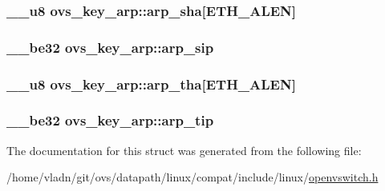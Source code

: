 \subsubsection[{arp\+\_\+sha}]{\setlength{\rightskip}{0pt plus 5cm}\+\_\+\+\_\+u8 ovs\+\_\+key\+\_\+arp\+::arp\+\_\+sha\mbox{[}E\+T\+H\+\_\+\+A\+L\+E\+N\mbox{]}}\label{structovs__key__arp_a99f6141da2e3151181663f27ab1a3560}
\hypertarget{structovs__key__arp_a25ce3912d909430a080dd3264d858892}{}
\subsubsection[{arp\+\_\+sip}]{\setlength{\rightskip}{0pt plus 5cm}\+\_\+\+\_\+be32 ovs\+\_\+key\+\_\+arp\+::arp\+\_\+sip}\label{structovs__key__arp_a25ce3912d909430a080dd3264d858892}
\hypertarget{structovs__key__arp_ab9f27ebc29aee381031d9b89d1b954ac}{}
\subsubsection[{arp\+\_\+tha}]{\setlength{\rightskip}{0pt plus 5cm}\+\_\+\+\_\+u8 ovs\+\_\+key\+\_\+arp\+::arp\+\_\+tha\mbox{[}E\+T\+H\+\_\+\+A\+L\+E\+N\mbox{]}}\label{structovs__key__arp_ab9f27ebc29aee381031d9b89d1b954ac}
\hypertarget{structovs__key__arp_a84a3d1edd8ba5960d41a69155e721d20}{}
\subsubsection[{arp\+\_\+tip}]{\setlength{\rightskip}{0pt plus 5cm}\+\_\+\+\_\+be32 ovs\+\_\+key\+\_\+arp\+::arp\+\_\+tip}\label{structovs__key__arp_a84a3d1edd8ba5960d41a69155e721d20}


The documentation for this struct was generated from the following file\+:\begin{DoxyCompactItemize}
\item 
/home/vladn/git/ovs/datapath/linux/compat/include/linux/\hyperlink{openvswitch_8h}{openvswitch.\+h}\end{DoxyCompactItemize}
